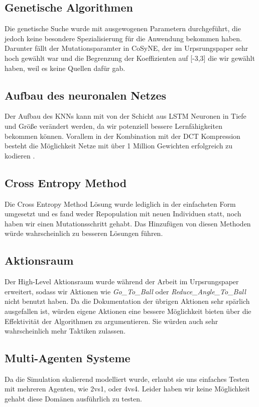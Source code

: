         \subsection{Genetische Algorithmen}
            Die genetische Suche wurde mit ausgewogenen Parametern durchgeführt, die jedoch keine besondere Spezialisierung für die Anwendung bekommen haben. Darunter fällt der Mutationsparamter in CoSyNE, der im Urpsrungspaper sehr hoch gewählt war \cite{cosyne2} und die Begrenzung der Koeffizienten auf [-3,3] die wir gewählt haben, weil es keine Quellen dafür gab. 
        \subsection{Aufbau des neuronalen Netzes}
            Der Aufbau des KNNs kann mit von der Schicht aus LSTM Neuronen in Tiefe und Größe verändert werden, da wir potenziell bessere Lernfähigkeiten bekommen können. Vorallem in der Kombination mit der DCT Kompression besteht die Möglichkeit Netze mit über 1 Million Gewichten erfolgreich zu kodieren \cite{cosyne4}.
        \subsection{Cross Entropy Method}
            Die Cross Entropy Method Lösung wurde lediglich in der einfachsten Form umgesetzt und es fand weder Repopulation mit neuen Individuen statt, noch haben wir einen Mutationsschritt gehabt. Das Hinzufügen von diesen Methoden würde wahrscheinlich zu besseren Lösungen führen.
        \subsection{Aktionsraum}
            Der High-Level Aktionsraum wurde während der Arbeit im Urpsrungspaper erweitert, sodass wir Aktionen wie \textit{Go\_To\_Ball} oder \textit{Reduce\_Angle\_To\_Ball} nicht benutzt haben. Da die Dokumentation der übrigen Aktionen sehr spärlich ausgefallen ist, würden eigene Aktionen eine bessere Möglichkeit bieten über die Effektivität der Algorithmen zu argumentieren. Sie würden auch sehr wahrscheinlich mehr Taktiken zulassen.
        \subsection{Multi-Agenten Systeme}
            Da die Simulation skalierend modelliert wurde, erlaubt sie uns einfaches Testen mit mehreren Agenten, wie 2vs1, oder 4vs4. Leider haben wir keine Möglichkeit gehabt diese Domänen ausführlich zu testen.

